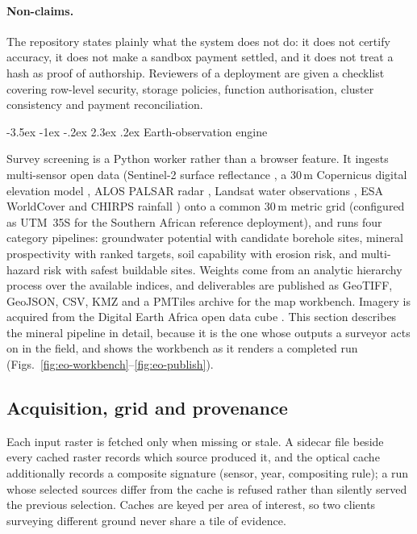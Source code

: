\documentclass[10pt,a4paper,twocolumn]{article}
\makeatletter
\renewcommand\section{\@startsection{section}{1}{\z@}
  {-3.5ex \@plus -1ex \@minus -.2ex}
  {2.3ex \@plus.2ex}
  {\normalfont\Large\bfseries\hyphenpenalty=10000\exhyphenpenalty=10000}}
\makeatother
\begin{document}
\paragraph{Non-claims.}
The repository states plainly what the system does not do: it does not certify
accuracy, it does not make a sandbox payment settled, and it does not treat a hash as
proof of authorship. Reviewers of a deployment are given a checklist covering
row-level security, storage policies, function authorisation, cluster consistency and
payment reconciliation.

\section{Earth-observation engine}
\label{sec:eo}

Survey screening is a Python worker rather than a browser feature. It ingests
multi-sensor open data (Sentinel-2 surface reflectance \cite{drusch2012}, a 30\,m
Copernicus digital elevation model \cite{copernicusdem}, ALOS PALSAR radar \cite{jaxapalsar},
Landsat water observations \cite{mueller2016}, ESA WorldCover \cite{zanaga2021} and CHIRPS
rainfall \cite{funk2015}) onto a common
30\,m metric grid (configured as UTM~35S for the Southern African reference deployment),
and runs four category pipelines: groundwater potential with candidate borehole sites,
mineral prospectivity with ranked targets, soil capability with erosion risk, and
multi-hazard risk with safest buildable sites. Weights come from an analytic hierarchy
process \cite{saaty1980} over the available indices, and deliverables are published as
GeoTIFF, GeoJSON, CSV, KMZ and a PMTiles archive for the map workbench. Imagery is
acquired from the Digital Earth Africa open data cube \cite{dea}. This section
describes the mineral pipeline in detail, because it is the one whose outputs a
surveyor acts on in the field, and shows the workbench as it renders a completed run
(Figs.~\ref{fig:eo-workbench}--\ref{fig:eo-publish}).

\subsection{Acquisition, grid and provenance}

Each input raster is fetched only when missing or stale. A sidecar file beside every
cached raster records which source produced it, and the optical cache additionally
records a composite signature (sensor, year, compositing rule); a run whose selected
sources differ from the cache is refused rather than silently served the previous
selection. Caches are keyed per area of interest, so two clients surveying different
ground never share a tile of evidence.
\end{document}
